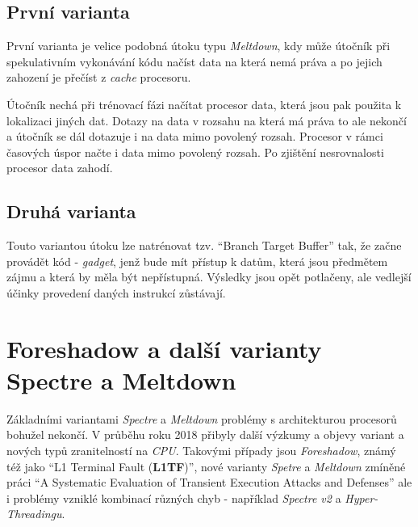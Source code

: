 \subsection{První varianta}\label{sec:spectre-v1}

První varianta je velice podobná útoku typu \textit{Meltdown}, kdy může útočník při spekulativním vykonávání kódu načíst data na která nemá práva a po jejich zahození je přečíst z \textit{cache} procesoru.

Útočník nechá při trénovací fázi načítat procesor data, která jsou pak použita k lokalizaci jiných dat.
Dotazy na data v rozsahu na která má práva to ale nekončí a útočník se dál dotazuje i na data mimo povolený rozsah.
Procesor v rámci časových úspor načte i data mimo povolený rozsah.
Po zjištění nesrovnalosti procesor data zahodí.

\subsection{Druhá varianta}\label{sec:spectre-v2}

Touto variantou útoku lze natrénovat tzv. \enquote{Branch Target Buffer} tak, že začne provádět kód - \textit{gadget}, jenž bude mít přístup k datům, která jsou předmětem zájmu a která by měla být nepřístupná.
Výsledky jsou opět potlačeny, ale vedlejší účinky provedení daných instrukcí zůstávají.

\section{Foreshadow a další varianty Spectre a Meltdown}

Základními variantami \textit{Spectre} a \textit{Meltdown} problémy s architekturou procesorů bohužel nekončí.
V průběhu roku 2018 přibyly další výzkumy a objevy variant a nových typů zranitelností na \textit{CPU}.
Takovými případy jsou \textit{Foreshadow}, známý též jako \enquote{L1 Terminal Fault (\textbf{L1TF})}, nové varianty \textit{Spetre} a \textit{Meltdown} zmíněné práci \enquote{A Systematic Evaluation of Transient Execution Attacks and Defenses} ale i problémy vzniklé kombinací různých chyb - například \textit{Spectre v2} a \textit{Hyper-Threadingu}.

